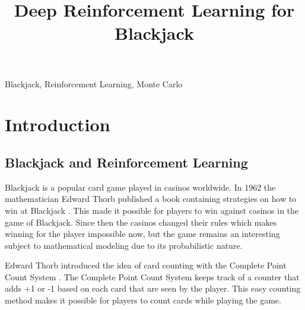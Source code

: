 \documentclass[conference]{IEEEtran}
\begin{document}
\title{Deep Reinforcement Learning for Blackjack}

\author{
}
\maketitle



\begin{abstract}
\end{abstract}

\begin{IEEEkeywords}
	Blackjack, Reinforcement Learning, Monte Carlo
\end{IEEEkeywords}

\section{Introduction}
\subsection{Blackjack and Reinforcement Learning} 
Blackjack is a popular card game played in casinos worldwide. 
In 1962 the mathematician Edward Thorb published a book containing strategies on how to win at Blackjack \cite{b1}. 
This made it possible for players to win against casinos in the game of Blackjack.
Since then the casinos changed their rules which makes winning for the player impossible now, but the game remains an interesting subject to mathematical modeling due to its probabilistic nature.    

Edward Thorb introduced the idea of card counting with the Complete Point Count System \cite{b1}.
The Complete Point Count System keeps track of a counter that adds +1 or -1 based on each card that are seen by the player. 
This easy counting method makes it possible for players to count cards while playing the game. 
\end{document}
